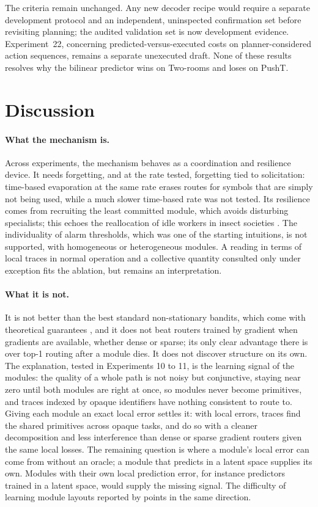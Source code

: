 \documentclass[11pt,a4paper]{article}
\begin{document}
The criteria remain unchanged. Any new decoder recipe would require a separate development protocol and an independent, uninspected confirmation set before revisiting planning; the audited validation set is now development evidence. Experiment~22, concerning predicted-versus-executed costs on planner-considered action sequences, remains a separate unexecuted draft. None of these results resolves why the bilinear predictor wins on Two-rooms and loses on PushT.

\section{Discussion}

\paragraph{What the mechanism is.} Across experiments, the mechanism behaves as a coordination and resilience device. It needs forgetting, and at the rate tested, forgetting tied to solicitation: time-based evaporation at the same rate erases routes for symbols that are simply not being used, while a much slower time-based rate was not tested. Its resilience comes from recruiting the least committed module, which avoids disturbing specialists; this echoes the reallocation of idle workers in insect societies \citep{bonabeau1996threshold,krieger2000robots}. The individuality of alarm thresholds, which was one of the starting intuitions, is not supported, with homogeneous or heterogeneous modules. A reading in terms of local traces in normal operation and a collective quantity consulted only under exception fits the ablation, but remains an interpretation.

\paragraph{What it is not.} It is not better than the best standard non-stationary bandits, which come with theoretical guarantees \citep{garivier2011switching}, and it does not beat routers trained by gradient when gradients are available, whether dense or sparse; its only clear advantage there is over top-1 routing after a module dies. It does not discover structure on its own. The explanation, tested in Experiments 10 to 11, is the learning signal of the modules: the quality of a whole path is not noisy but conjunctive, staying near zero until both modules are right at once, so modules never become primitives, and traces indexed by opaque identifiers have nothing consistent to route to. Giving each module an exact local error settles it: with local errors, traces find the shared primitives across opaque tasks, and do so with a cleaner decomposition and less interference than dense or sparse gradient routers given the same local losses. The remaining question is where a module's local error can come from without an oracle; a module that predicts in a latent space supplies its own. Modules with their own local prediction error, for instance predictors trained in a latent space, would supply the missing signal. The difficulty of learning module layouts reported by \citet{bahdanau2019systematic} points in the same direction.
\end{document}

